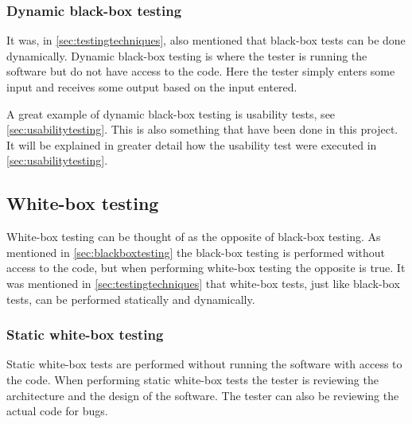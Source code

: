 \subsubsection{Dynamic black-box testing}
It was, in \cref{sec:testingtechniques}, also mentioned that black-box tests can be done dynamically.
Dynamic black-box testing is where the tester is running the software but do not have access to the code. 
Here the tester simply enters some input and receives some output based on the input entered. \cite{SoftwareTesting}

A great example of dynamic black-box testing is usability tests, see \cref{sec:usabilitytesting}.
This is also something that have been done in this project.
It will be explained in greater detail how the usability test were executed in \cref{sec:usabilitytesting}.

\subsection{White-box testing} \label{sec:whiteboxtesting}
White-box testing can be thought of as the opposite of black-box testing.
As mentioned in \cref{sec:blackboxtesting} the black-box testing is performed without access to the code, but when performing white-box testing the opposite is true.
It was mentioned in \cref{sec:testingtechniques} that white-box tests, just like black-box tests, can be performed statically and dynamically.

\subsubsection{Static white-box testing} \label{staticwhitebox}
Static white-box tests are performed without running the software with access to the code. 
When performing static white-box tests the tester is reviewing the architecture and the design of the software.
The tester can also be reviewing the actual code for bugs. \cite{SoftwareTesting} 

